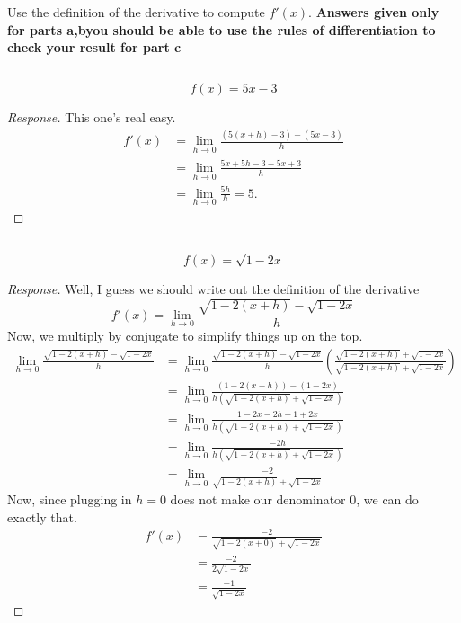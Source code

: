 \documentclass[english]{article}
\newcommand{\prob}[1]{\setcounter{section}{#1-1}\section{}}
\newcommand{\prt}[1]{\setcounter{subsection}{#1-1}\subsection{}}
\theoremstyle{remark}
\theoremstyle{definition}
\newcommand{\resp}[1]{\begin{proof}[Response]{#1}\end{proof}}
\begin{document}
	\prob{6} Use the definition of the derivative to compute $f'(x)$.
\textbf{Answers given only for parts a,b\textemdash you should be able to use the rules of differentiation to check your result for part c}
	\prt{1} $$f(x)=5x-3$$
	\resp{This one's real easy.
\begin{align*}
	f'(x)&=\lim_{h\to 0}\frac{(5(x+h)-3)-(5x-3)}{h}\\
	&=\lim_{h\to 0}\frac{5x+5h-3-5x+3}{h}\\
	&=\lim_{h\to 0}\frac{5h}{h}=5.
\end{align*}	
}
	\prt{2} $$f(x)=\sqrt{1-2x}$$
	\resp{
Well, I guess we should write out the definition of the derivative\textellipsis
$$f'(x)=\lim_{h\to 0}\frac{\sqrt{1-2(x+h)}-\sqrt{1-2x}}{h}$$
Now, we multiply by conjugate to simplify things up on the top.	\begin{align*}
\lim_{h\to 0}\frac{\sqrt{1-2(x+h)}-\sqrt{1-2x}}{h}&=\lim_{h\to 0}\frac{\sqrt{1-2(x+h)}-\sqrt{1-2x}}{h}\left(\frac{\sqrt{1-2(x+h)}+\sqrt{1-2x}}{\sqrt{1-2(x+h)}+\sqrt{1-2x}}\right)\\
&=\lim_{h\to 0}\frac{(1-2(x+h))-(1-2x)}{h(\sqrt{1-2(x+h)}+\sqrt{1-2x})}\\&=\lim_{h\to 0}\frac{1-2x-2h-1+2x}{h(\sqrt{1-2(x+h)}+\sqrt{1-2x})}\\&=\lim_{h\to 0}\frac{-2h}{h(\sqrt{1-2(x+h)}+\sqrt{1-2x})}\\
&=\lim_{h\to 0}\frac{-2}{\sqrt{1-2(x+h)}+\sqrt{1-2x}}
\end{align*}
Now, since plugging in $h=0$ does not make our denominator 0, we can do exactly that.
\begin{align*}
	f'(x)&=\frac{-2}{\sqrt{1-2(x+0)}+\sqrt{1-2x}}\\&=\frac{-2}{2\sqrt{1-2x}}\\&=\frac{-1}{\sqrt{1-2x}}
\end{align*}
}
	
\end{document}
